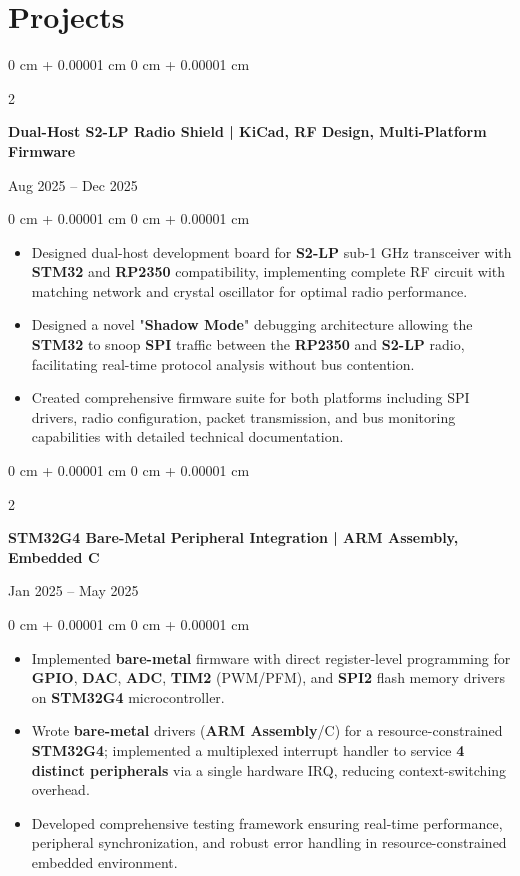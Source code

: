 \documentclass[10pt, letterpaper]{article}
\newenvironment{highlights}{
    \begin{itemize}[
        topsep=0.05 cm,
        parsep=0.05 cm,
        partopsep=0pt,
        itemsep=0pt,
        leftmargin=0 cm + 10pt
    ]
}{
    \end{itemize}
}
\newenvironment{onecolentry}{
    \begin{adjustwidth}{
        0 cm + 0.00001 cm
    }{
        0 cm + 0.00001 cm
    }
}{
    \end{adjustwidth}
}
\newenvironment{twocolentry}[2][]{
    \onecolentry
    \def\secondColumn{#2}
    \setcolumnwidth{\fill, 4.5 cm}
    \begin{paracol}{2}
}{
    \switchcolumn \raggedleft \secondColumn
    \end{paracol}
    \endonecolentry
}
\begin{document}
    \section{Projects}

        \begin{twocolentry}{
            Aug 2025 – Dec 2025
        }
            \textbf{Dual-Host S2-LP Radio Shield | KiCad, RF Design, Multi-Platform Firmware}
        \end{twocolentry}
        \vspace{0.05 cm}
        \begin{onecolentry}
            \begin{highlights}
                \item Designed dual-host development board for \textbf{S2-LP} sub-1 GHz transceiver with \textbf{STM32} and \textbf{RP2350} compatibility, implementing complete RF circuit with matching network and crystal oscillator for optimal radio performance.
                \item Designed a novel "\textbf{Shadow Mode}" debugging architecture allowing the \textbf{STM32} to snoop \textbf{SPI} traffic between the \textbf{RP2350} and \textbf{S2-LP} radio, facilitating real-time protocol analysis without bus contention.
                \item Created comprehensive firmware suite for both platforms including SPI drivers, radio configuration, packet transmission, and bus monitoring capabilities with detailed technical documentation.
            \end{highlights}
        \end{onecolentry}

        \vspace{0.10 cm}
        \begin{twocolentry}{
            Jan 2025 – May 2025
        }
            \textbf{STM32G4 Bare-Metal Peripheral Integration | ARM Assembly, Embedded C}
        \end{twocolentry}
        \vspace{0.05 cm}
        \begin{onecolentry}
            \begin{highlights}
                \item Implemented \textbf{bare-metal} firmware with direct register-level programming for \textbf{GPIO}, \textbf{DAC}, \textbf{ADC}, \textbf{TIM2} (PWM/PFM), and \textbf{SPI2} flash memory drivers on \textbf{STM32G4} microcontroller.
                \item Wrote \textbf{bare-metal} drivers (\textbf{ARM Assembly}/C) for a resource-constrained \textbf{STM32G4}; implemented a multiplexed interrupt handler to service \textbf{4 distinct peripherals} via a single hardware IRQ, reducing context-switching overhead.
                \item Developed comprehensive testing framework ensuring real-time performance, peripheral synchronization, and robust error handling in resource-constrained embedded environment.
            \end{highlights}
        \end{onecolentry}
\end{document}
